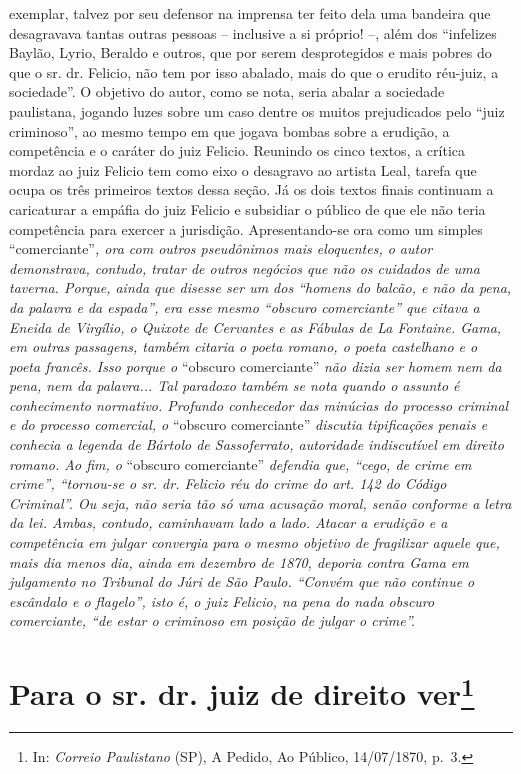 \begin{argumento}
{exemplar, talvez por seu defensor na imprensa ter feito dela uma
bandeira que desagravava tantas outras pessoas -- inclusive a si
próprio! --, além dos ``infelizes Baylão, Lyrio, Beraldo e outros, que
por serem desprotegidos e mais pobres do que o sr. dr. Felicio, não tem
por isso abalado, mais do que o erudito réu-juiz, a sociedade''. O
objetivo do autor, como se nota, seria abalar a sociedade paulistana,
jogando luzes sobre um caso dentre os muitos prejudicados pelo ``juiz
criminoso'', ao mesmo tempo em que jogava bombas sobre a erudição, a
competência e o caráter do juiz Felicio. Reunindo os cinco textos, a
crítica mordaz ao juiz Felicio tem como eixo o desagravo ao artista
Leal, tarefa que ocupa os três primeiros textos dessa seção. Já os dois
textos finais continuam a caricaturar a empáfia do juiz Felicio e
subsidiar o público de que ele não teria competência para exercer a
jurisdição. Apresentando-se ora como um simples} ``comerciante''\emph{,
ora com outros pseudônimos mais eloquentes, o autor demonstrava,
contudo, tratar de outros negócios que não os cuidados de uma taverna.
Porque, ainda que disesse ser um dos ``homens do balcão, e não da pena,
da palavra e da espada'', era esse mesmo ``obscuro comerciante'' que citava
a Eneida de Virgílio, o Quixote de Cervantes e as Fábulas de La
Fontaine. Gama, em outras passagens, também citaria o poeta romano, o
poeta castelhano e o poeta francês. Isso porque o} ``obscuro comerciante''
\emph{não dizia ser homem nem da pena, nem da palavra... Tal paradoxo
também se nota quando o assunto é conhecimento normativo. Profundo
conhecedor das minúcias do processo criminal e do processo comercial, o}
``obscuro comerciante'' \emph{discutia tipificações penais e conhecia a
legenda de Bártolo de Sassoferrato, autoridade indiscutível em direito
romano. Ao fim, o} ``obscuro comerciante'' \emph{defendia que, ``cego, de
crime em crime'', ``tornou-se o sr. dr. Felicio réu do crime do art. 142
do Código Criminal''. Ou seja, não seria tão só uma acusação moral, senão
conforme a letra da lei. Ambas, contudo, caminhavam lado a lado. Atacar
a erudição e a competência em julgar convergia para o mesmo objetivo de
fragilizar aquele que, mais dia menos dia, ainda em dezembro de 1870,
deporia contra Gama em julgamento no Tribunal do Júri de São Paulo.
``Convém que não continue o escândalo e o flagelo'', isto é, o juiz
Felicio, na pena do nada obscuro comerciante, ``de estar o criminoso em
posição de julgar o crime''.}
\end{argumento}

\chapter{Para o sr. dr. juiz de direito ver\footnote{ In: \emph{Correio Paulistano} (SP), A Pedido, Ao Público,
  14/07/1870, p.~3.}} %

